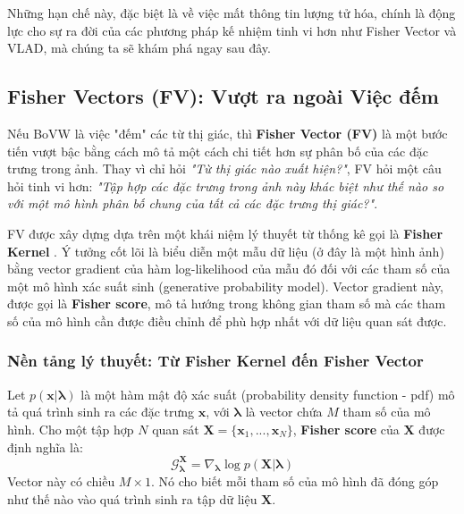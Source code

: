 Những hạn chế này, đặc biệt là về việc mất thông tin lượng tử hóa, chính là động lực cho sự ra đời của các phương pháp kế nhiệm tinh vi hơn như Fisher Vector và VLAD, mà chúng ta sẽ khám phá ngay sau đây.

\subsection{Fisher Vectors (FV): Vượt ra ngoài Việc đếm}
\label{subsec:fisher_vectors}

Nếu BoVW là việc "đếm" các từ thị giác, thì \textbf{Fisher Vector (FV)} \cite{Sanchez2013} là một bước tiến vượt bậc bằng cách mô tả một cách chi tiết hơn sự phân bố của các đặc trưng trong ảnh. Thay vì chỉ hỏi \textit{"Từ thị giác nào xuất hiện?"}, FV hỏi một câu hỏi tinh vi hơn: \textit{"Tập hợp các đặc trưng trong ảnh này khác biệt như thế nào so với một mô hình phân bố chung của tất cả các đặc trưng thị giác?"}.

FV được xây dựng dựa trên một khái niệm lý thuyết từ thống kê gọi là \textbf{Fisher Kernel} \cite{Jaakkola1999}. Ý tưởng cốt lõi là biểu diễn một mẫu dữ liệu (ở đây là một hình ảnh) bằng vector gradient của hàm log-likelihood của mẫu đó đối với các tham số của một mô hình xác suất sinh (generative probability model). Vector gradient này, được gọi là \textbf{Fisher score}, mô tả hướng trong không gian tham số mà các tham số của mô hình cần được điều chỉnh để phù hợp nhất với dữ liệu quan sát được.

\subsubsection{Nền tảng lý thuyết: Từ Fisher Kernel đến Fisher Vector}
\label{subsubsec:fv_theory}
Let $p(\mathbf{x}|\boldsymbol{\lambda})$ là một hàm mật độ xác suất (probability density function - pdf) mô tả quá trình sinh ra các đặc trưng $\mathbf{x}$, với $\boldsymbol{\lambda}$ là vector chứa $M$ tham số của mô hình. Cho một tập hợp $N$ quan sát $\mathbf{X} = \{\mathbf{x}_1, ..., \mathbf{x}_N\}$, \textbf{Fisher score} của $\mathbf{X}$ được định nghĩa là:
\begin{equation}
    \mathcal{G}_{\boldsymbol{\lambda}}^{\mathbf{X}} = \nabla_{\boldsymbol{\lambda}} \log p(\mathbf{X}|\boldsymbol{\lambda})
    \label{eq:fisher_score}
\end{equation}
Vector này có chiều $M \times 1$. Nó cho biết mỗi tham số của mô hình đã đóng góp như thế nào vào quá trình sinh ra tập dữ liệu $\mathbf{X}$.

